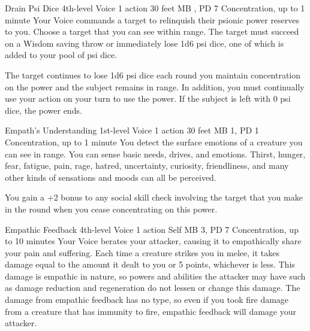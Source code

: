 \DndPowerHeader%
  {Drain Psi Dice}
  {4th-level Voice}
  {1 action}
  {30 feet}
  {MB , PD 7}
  {Concentration, up to 1 minute}
Your Voice commands a target to relinquish their psionic power
reserves to you.
Choose a target that you can see within range.
The target must succeed on a Wisdom saving throw
or immediately lose 1d6 psi dice, one of which is added
to your pool of psi dice.

The target continues to lose 1d6 psi dice each round you
maintain concentration on the power and the subject remains
in range.
In addition, you must continually use your action on your turn
to use the power.
If the subject is left with 0 psi dice, the power ends.

\DndPowerHeader%
  {Empath's Understanding}
  {1st-level Voice}
  {1 action}
  {30 feet}
  {MB 1, PD 1}
  {Concentration, up to 1 minute}
You detect the surface emotions of a creature you can see in range.
You can sense basic needs, drives, and emotions.
Thirst, hunger, fear, fatigue, pain, rage, hatred, uncertainty,
curiosity, friendliness, and many other kinds of sensations and moods
can all be perceived.

You gain a +2 bonus to any social skill check involving the target
that you make in the round when you cease concentrating on this power.

\DndPowerHeader%
  {Empathic Feedback}
  {4th-level Voice}
  {1 action}
  {Self}
  {MB 3, PD 7}
  {Concentration, up to 10 minutes}
Your Voice berates your attacker,
causing it to empathically share your pain and suffering.
Each time a creature strikes you in melee,
it takes damage equal to the amount it dealt to you or 5 points,
whichever is less.
This damage is empathic in nature,
so powers and abilities the attacker may have such as damage reduction
and regeneration do not lessen or change this damage.
The damage from empathic feedback has no type,
so even if you took fire damage from a creature
that has immunity to fire,
empathic feedback will damage your attacker.


